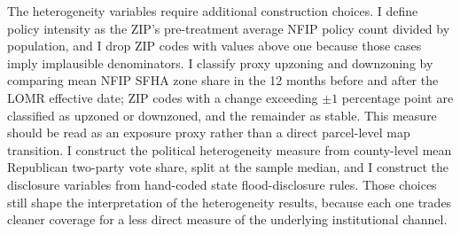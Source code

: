\documentclass[12pt]{article}
\begin{document}
The heterogeneity variables require additional construction choices. I define policy intensity as the ZIP's pre-treatment average NFIP policy count divided by population, and I drop ZIP codes with values above one because those cases imply implausible denominators. I classify proxy upzoning and downzoning by comparing mean NFIP SFHA zone share in the 12 months before and after the LOMR effective date; ZIP codes with a change exceeding $\pm 1$ percentage point are classified as upzoned or downzoned, and the remainder as stable. This measure should be read as an exposure proxy rather than a direct parcel-level map transition. I construct the political heterogeneity measure from county-level mean Republican two-party vote share, split at the sample median, and I construct the disclosure variables from hand-coded state flood-disclosure rules. Those choices still shape the interpretation of the heterogeneity results, because each one trades cleaner coverage for a less direct measure of the underlying institutional channel.
\end{document}
